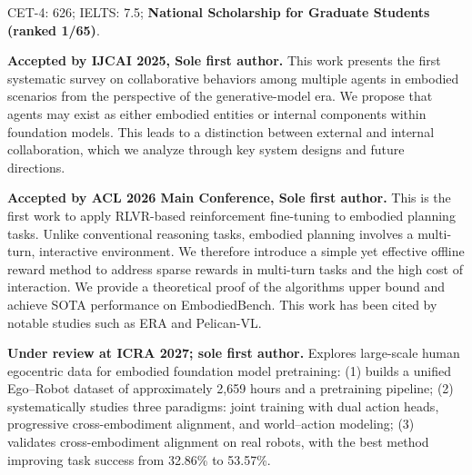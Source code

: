 \documentclass[10pt]{article}
\begin{document}


\begin{cvitems}
\item CET-4: 626; IELTS: 7.5; \textbf{National Scholarship for Graduate Students (ranked 1/65)}.
\end{cvitems}

\textbf{Accepted by IJCAI 2025, Sole first author.} This work presents the first systematic survey on collaborative behaviors among multiple agents in embodied scenarios from the perspective of the generative-model era. We propose that agents may exist as either embodied entities or internal components within foundation models. This leads to a distinction between external and internal collaboration, which we analyze through key system designs and future directions.

\textbf{Accepted by ACL 2026 Main Conference, Sole first author.} This is the first work to apply RLVR-based reinforcement fine-tuning to embodied planning tasks. Unlike conventional reasoning tasks, embodied planning involves a multi-turn, interactive environment. We therefore introduce a simple yet effective offline reward method to address sparse rewards in multi-turn tasks and the high cost of interaction. We provide a theoretical proof of the algorithm\textquotesingle{}s upper bound and achieve SOTA performance on EmbodiedBench. This work has been cited by notable studies such as ERA and Pelican-VL.

\textbf{Under review at ICRA 2027; sole first author.} Explores large-scale human egocentric data for embodied foundation model pretraining: (1) builds a unified Ego--Robot dataset of approximately 2,659 hours and a pretraining pipeline; (2) systematically studies three paradigms: joint training with dual action heads, progressive cross-embodiment alignment, and world--action modeling; (3) validates cross-embodiment alignment on real robots, with the best method improving task success from 32.86\% to 53.57\%.
\end{document}
